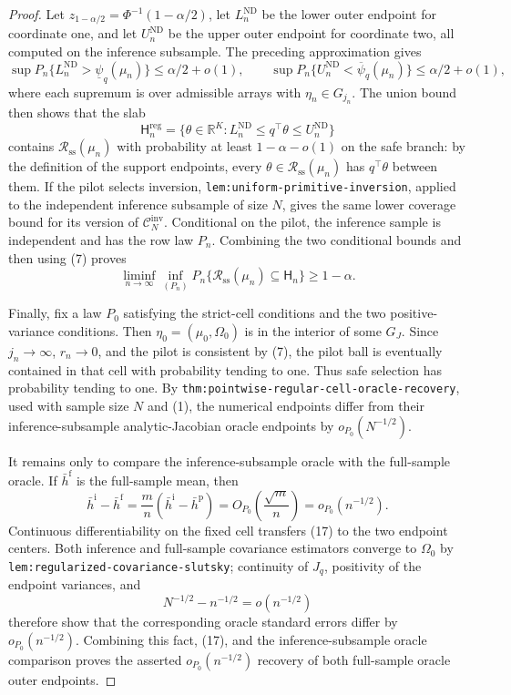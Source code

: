 \documentclass{article}
\begin{document}
\begin{proof}
Let \(z_{1-\alpha/2}=\Phi^{-1}(1-\alpha/2)\), let \(L_n^{\mathrm{ND}}\) be the lower outer endpoint for coordinate one, and let \(U_n^{\mathrm{ND}}\) be the upper outer endpoint for coordinate two, all computed on the inference subsample.  The preceding approximation gives
\[
 \sup P_n\{L_n^{\mathrm{ND}}>\underline\psi_q(\mu_n)\}
 \le \alpha/2+o(1),
 \qquad
 \sup P_n\{U_n^{\mathrm{ND}}<\overline\psi_q(\mu_n)\}
 \le \alpha/2+o(1), \tag{15}
\]
where each supremum is over admissible arrays with \(\eta_n\in G_{j_n}\).  The union bound then shows that the slab
\[
 \mathsf H_n^{\mathrm{reg}}
 =\{\theta\in\mathbb R^K:L_n^{\mathrm{ND}}\le q^\top\theta\le U_n^{\mathrm{ND}}\}
\]
contains \(\mathcal R_{\mathrm{ss}}(\mu_n)\) with probability at least \(1-\alpha-o(1)\) on the safe branch: by the definition of the support endpoints, every \(\theta\in\mathcal R_{\mathrm{ss}}(\mu_n)\) has \(q^\top\theta\) between them.  If the pilot selects inversion, \texttt{lem:uniform-primitive-inversion}, applied to the independent inference subsample of size \(N\), gives the same lower coverage bound for its version of \(\mathcal C_N^{\mathrm{inv}}\).  Conditional on the pilot, the inference sample is independent and has the row law \(P_n\).  Combining the two conditional bounds and then using (7) proves
\[
 \liminf_{n\to\infty}\inf_{(P_n)}
 P_n\{\mathcal R_{\mathrm{ss}}(\mu_n)\subseteq\mathsf H_n\}\ge1-\alpha. \tag{16}
\]

Finally, fix a law \(P_0\) satisfying the strict-cell conditions and the two positive-variance conditions.  Then \(\eta_0=(\mu_0,\Omega_0)\) is in the interior of some \(G_J\).  Since \(j_n\to\infty\), \(r_n\to0\), and the pilot is consistent by (7), the pilot ball is eventually contained in that cell with probability tending to one.  Thus safe selection has probability tending to one.  By \texttt{thm:pointwise-regular-cell-oracle-recovery}, used with sample size \(N\) and (1), the numerical endpoints differ from their inference-subsample analytic-Jacobian oracle endpoints by \(o_{P_0}(N^{-1/2})\).

It remains only to compare the inference-subsample oracle with the full-sample oracle.  If \(\bar h^{\mathrm f}\) is the full-sample mean, then
\[
 \bar h^{\mathrm i}-\bar h^{\mathrm f}
 =\frac{m}{n}(\bar h^{\mathrm i}-\bar h^{\mathrm p})
 =O_{P_0}\!\left(\frac{\sqrt m}{n}\right)
 =o_{P_0}(n^{-1/2}). \tag{17}
\]
Continuous differentiability on the fixed cell transfers (17) to the two endpoint centers.  Both inference and full-sample covariance estimators converge to \(\Omega_0\) by \texttt{lem:regularized-covariance-slutsky}; continuity of \(J_q\), positivity of the endpoint variances, and
\[
 N^{-1/2}-n^{-1/2}=o(n^{-1/2})
\]
therefore show that the corresponding oracle standard errors differ by \(o_{P_0}(n^{-1/2})\).  Combining this fact, (17), and the inference-subsample oracle comparison proves the asserted \(o_{P_0}(n^{-1/2})\) recovery of both full-sample oracle outer endpoints.
\end{proof}
\end{document}
